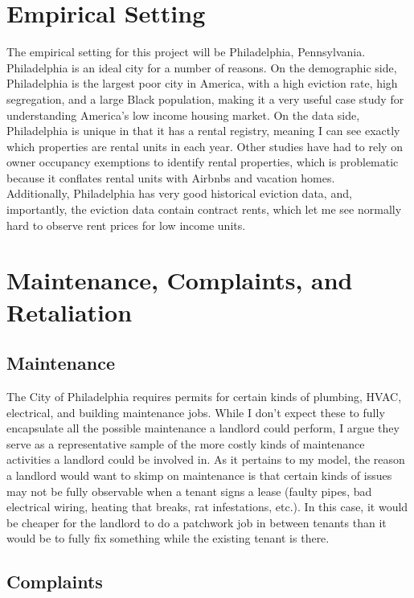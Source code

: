 \documentclass[11pt]{article}
\begin{document}
\section{Empirical Setting}

The empirical setting for this project will be Philadelphia, Pennsylvania. Philadelphia is an ideal city for a number of reasons. On the demographic side, Philadelphia is the largest poor city in America, with a high eviction rate, high segregation, and a large Black population, making it a very useful case study for understanding America's low income housing market. On the data side, Philadelphia is unique in that it has a rental registry, meaning I can see exactly which properties are rental units in each year. Other studies have had to rely on owner occupancy exemptions to identify rental properties, which is problematic because it conflates rental units with Airbnbs and vacation homes. \\

Additionally, Philadelphia has very good historical eviction data, and, importantly, the eviction data contain contract rents, which let me see normally hard to observe rent prices for low income units. 

\section{Maintenance, Complaints, and Retaliation}

\subsection{Maintenance}

The City of Philadelphia requires permits for certain kinds of plumbing, HVAC, electrical, and building maintenance jobs. While I don't expect these to fully encapsulate all the possible maintenance a landlord could perform, I argue they serve as a representative sample of the more costly kinds of maintenance activities a landlord could be involved in. As it pertains to my model, the reason a landlord would want to skimp on maintenance is that certain kinds of issues may not be fully observable when a tenant signs a lease (faulty pipes, bad electrical wiring, heating that breaks, rat infestations, etc.). In this case, it would be cheaper for the landlord to do a patchwork job in between tenants than it would be to fully fix something while the existing tenant is there.

\subsection{Complaints}
\end{document}
